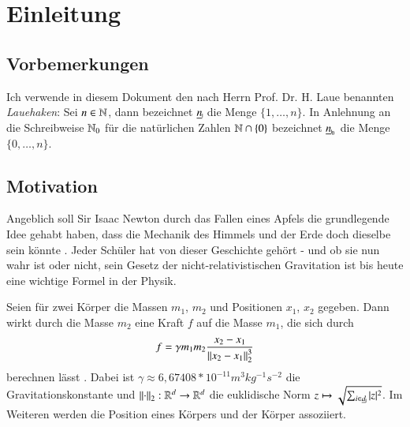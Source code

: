 \chapter{Einleitung}
\label{ch:einl}
  \section*{Vorbemerkungen}
    Ich verwende in diesem Dokument den nach Herrn Prof. Dr. H. Laue benannten \textit{Lauehaken}: Sei $n \in \mathbb{N}$, dann bezeichnet $\haken{n}$ die Menge $\{1, \dots ,n\}$.
    In Anlehnung an die Schreibweise $\mathbb{N}_0$ für die natürlichen Zahlen $\mathbb{N} \cap \{0\}$ bezeichnet $\nullhaken{n}$ die Menge $\{0, \dots , n\}$.
  \section{Motivation}
  \label{sec:mot}
    Angeblich soll Sir Isaac Newton durch das Fallen eines Apfels die grundlegende Idee gehabt haben, dass die Mechanik des Himmels und der Erde doch dieselbe sein 
    könnte \citep{memoirs}. Jeder Schüler hat von dieser Geschichte gehört - und ob sie nun wahr ist oder nicht, sein Gesetz der nicht-relativistischen Gravitation ist bis
    heute eine wichtige Formel in der Physik.
    
    Seien für zwei Körper die Massen $m_1$, $m_2$ und Positionen $x_1$, $x_2$ gegeben. Dann wirkt durch die Masse $m_2$ eine Kraft $f$ auf die Masse $m_1$, die sich durch 
    \begin{equation}
      f = \gamma m_1 m_2 \frac{x_2 - x_1}{\left\lVert x_2 - x_1\right\rVert^3_2}
      \label{eq:simple_grav}
    \end{equation}
    berechnen lässt \citep{newton}. Dabei ist $\gamma \approx 6{,}67408*10^{-11} m^3 kg^{-1} s^{-2}$ die Gravitationskonstante \citep{graviconst} und $\left\lVert\cdot\right\rVert_2: \mathbb{R}^d \to \mathbb{R}^d$ die 
    euklidische Norm $z \mapsto \sqrt{ \sum_{i \in \haken{d}} |z|^2 }$. Im Weiteren werden die Position eines Körpers und der Körper assoziiert. 
    
